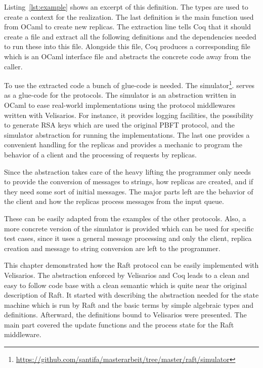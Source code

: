 Listing~\ref{lst:example} shows an excerpt of this definition.
The types are used to create a context for the realization.
The last definition is the main function used from OCaml to
create new replicas.
The extraction line tells Coq that it should create a file
 and extract all the following definitions
and the dependencies needed to run these into this file. 
Alongside this file, Coq produces a corresponding 
file which is an OCaml interface file and abstracts the
concrete code away from the caller.

To use the extracted code a bunch of glue-code is needed.
The simulator\footnote{\url{https://github.com/santifa/masterarbeit/tree/master/raft/simulator}}.
serves as a glue-code for the protocols.
The simulator is an abstraction written in OCaml to ease
real-world implementations using the protocol middlewares
written with Velisarios.  
For instance, it provides logging facilities, 
the possibility to generate RSA keys which are used the original
PBFT protocol, and the simulator abstraction for
running the implementations. The last one provides
a convenient handling for the replicas and provides
a mechanic to program the behavior of a client and
the processing of requests by replicas.

Since the abstraction takes care of the heavy lifting
the programmer only needs to provide the conversion of
messages to strings, how replicas are created, and if they
need some sort of initial messages. The major parts left
are the behavior of the client and how the replicas process
messages from the input queue.

These can be easily adapted from the examples of the
other protocols. Also, a more concrete version of
the simulator is provided which can be used for
specific test cases, since it uses a general message
processing and only the client, replica creation and
message to string conversion are left to the programmer.

\vspace{2em}

This chapter demonstrated how the Raft protocol can be
easily implemented with Velisarios. The abstraction
enforced by Velisarios and Coq leads to a clean and
easy to follow code base with a clean semantic which
is quite near the original description of Raft.
It started with describing the abstraction needed
for the state machine which is run by Raft and
the basic terms by simple algebraic types and
definitions. Afterward, the definitions bound
to Velisarios were presented. The main part
covered the update functions and the process
state for the Raft middleware. 



